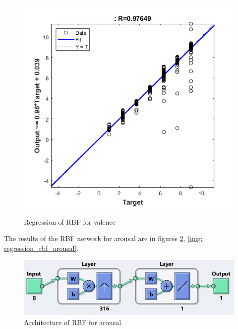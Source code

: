 \documentclass[a4paper]{report}
\begin{document}
	\begin{figure}[htbp]
		\centering
		\includegraphics[scale=1]{img/regression_rbf_valence.png}
		\caption{Regression of RBF for valence}
		\label{img: regression_rbf_valence}
	\end{figure}
\newpage
	\noindent The results of the RBF network for arousal are in figures \ref{img: rbf_arousal}, \ref{img: regression_rbf_arousal}.
	
	
	\begin{figure}[htbp]
		\centering
		\includegraphics[scale=0.8]{img/rbf_arousal.png}
		\caption{Architecture of RBF for arousal}
		\label{img: rbf_arousal}
	\end{figure}
\end{document}
